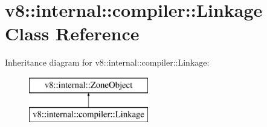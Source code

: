 \hypertarget{classv8_1_1internal_1_1compiler_1_1_linkage}{}\section{v8\+:\+:internal\+:\+:compiler\+:\+:Linkage Class Reference}
\label{classv8_1_1internal_1_1compiler_1_1_linkage}
Inheritance diagram for v8\+:\+:internal\+:\+:compiler\+:\+:Linkage\+:\begin{figure}[H]
\begin{center}
\leavevmode
\includegraphics[height=2.000000cm]{classv8_1_1internal_1_1compiler_1_1_linkage}
\end{center}
\end{figure}
